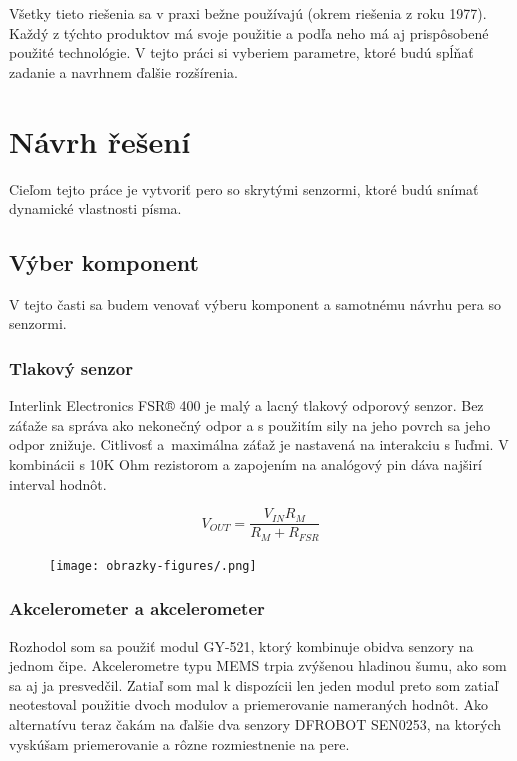 Všetky tieto riešenia sa v praxi bežne používajú (okrem riešenia z roku 1977). Každý z týchto produktov má svoje použitie a podľa neho má aj prispôsobené použité technológie. V tejto práci si vyberiem parametre, ktoré budú spĺňať zadanie a navrhnem ďalšie rozšírenia. 

\chapter{Návrh řešení}

Cieľom tejto práce je vytvoriť pero so skrytými senzormi, ktoré budú snímať dynamické vlastnosti písma. 

\section{Výber komponent}

V tejto časti sa budem venovať výberu komponent a samotnému návrhu pera so senzormi.

\subsection*{Tlakový senzor}

Interlink Electronics FSR® 400 je malý a lacný tlakový odporový senzor. Bez záťaže sa správa ako nekonečný odpor a s použitím sily na jeho povrch sa jeho odpor znižuje. Citlivosť a~maximálna záťaž je nastavená na interakciu s ľuďmi. \cite{fsr400}
V kombinácii s 10K Ohm rezistorom a zapojením na analógový pin dáva najširí interval hodnôt.

\[
V_{OUT} = \frac{V_{IN} R_M} {R_M + R_{FSR}}
\]
\begin{figure}[hbt]
	\centering
	\texttt{[image: obrazky-figures/.png]}
	\caption{}
	\label{}
\end{figure}


\subsection*{Akcelerometer a akcelerometer}

Rozhodol som sa použiť modul GY-521, ktorý kombinuje obidva senzory na jednom čipe. Akcelerometre typu MEMS trpia zvýšenou hladinou šumu\cite{PawlusJan2019Zpns}, ako som sa aj ja presvedčil. Zatiaľ som mal k dispozícii len jeden modul preto som zatiaľ neotestoval použitie dvoch modulov a priemerovanie nameraných hodnôt. Ako alternatívu teraz čakám na ďalšie dva senzory DFROBOT SEN0253\cite{PohybovySenzor}, na ktorých vyskúšam priemerovanie a rôzne rozmiestnenie na pere.

